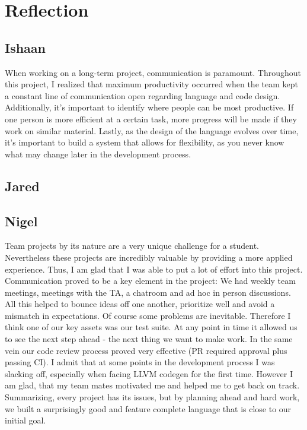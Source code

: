 \chapter{Reflection}

\section{Ishaan}
When working on a long-term project, communication is paramount. Throughout this project, I realized that maximum productivity occurred when the team kept a constant line of communication open regarding language and code design.
Additionally, it's important to identify where people can be most productive. If one person is more efficient at a certain task, more progress will be made if they work on similar material.
Lastly, as the design of the language evolves over time, it's important to build a system that allows for flexibility, as you never know what may change later in the development process.

\section{Jared}

\section{Nigel}
Team projects by its nature are a very unique challenge for a student. Nevertheless these projects are incredibly valuable by providing a more applied experience. Thus, I am glad that I was able to put a lot of effort into this project. Communication proved to be a key element in the project: We had weekly team meetings, meetings with the TA, a chatroom and ad hoc in person discussions. All this helped to bounce ideas off one another, prioritize well and avoid a mismatch in expectations.
Of course some problems are inevitable. Therefore I think one of our key assets was our test suite. At any point in time it allowed us to see the next step ahead - the next thing we want to make work. In the same vein our code review process proved very effective (PR required approval plus passing CI).
I admit that at some points in the development process I was slacking off, especially when facing LLVM codegen for the first time. However I am glad, that my team mates motivated me and helped me to get back on track.
Summarizing, every project has its issues, but by planning ahead and hard work, we built a surprisingly good and feature complete language that is close to our initial goal.

